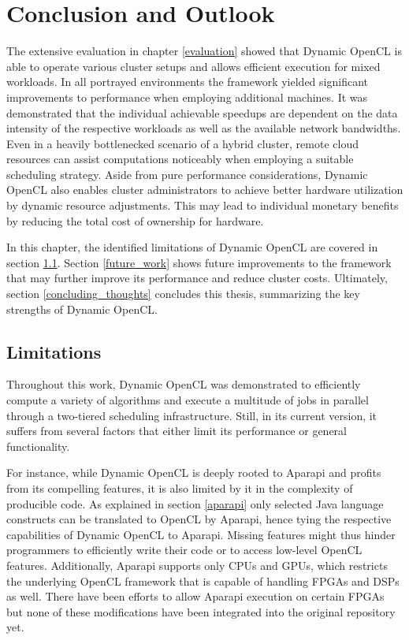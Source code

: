 \chapter{Conclusion and Outlook}
\label{conclusion}
The extensive evaluation in chapter \ref{evaluation} showed that Dynamic OpenCL is able to operate various cluster setups and allows efficient execution for mixed workloads. In all portrayed environments the framework yielded significant improvements to performance when employing additional machines. It was demonstrated that the individual achievable speedups are dependent on the data intensity of the respective workloads as well as the available network bandwidths. Even in a heavily bottlenecked scenario of a hybrid cluster, remote cloud resources can assist computations noticeably when employing a suitable scheduling strategy. Aside from pure performance considerations, Dynamic OpenCL also enables cluster administrators to achieve better hardware utilization by dynamic resource adjustments. This may lead to individual monetary benefits by reducing the total cost of ownership for hardware.

In this chapter, the identified limitations of Dynamic OpenCL are covered in section \ref{limitations}. Section \ref{future_work} shows future improvements to the framework that may further improve its performance and reduce cluster costs. Ultimately, section \ref{concluding_thoughts} concludes this thesis, summarizing the key strengths of Dynamic OpenCL.

\section{Limitations}
\label{limitations}
Throughout this work, Dynamic OpenCL was demonstrated to efficiently compute a variety of algorithms and execute a multitude of jobs in parallel through a two-tiered scheduling infrastructure. Still, in its current version, it suffers from several factors that either limit its performance or general functionality.

For instance, while Dynamic OpenCL is deeply rooted to Aparapi and profits from its compelling features, it is also limited by it in the complexity of producible code. As explained in section \ref{aparapi} only selected Java language constructs can be translated to OpenCL by Aparapi, hence tying the respective capabilities of Dynamic OpenCL to Aparapi. Missing features might thus hinder programmers to efficiently write their code or to access low-level OpenCL features. Additionally, Aparapi supports only CPUs and GPUs, which restricts the underlying OpenCL framework that is capable of handling FPGAs and DSPs as well. There have been efforts to allow Aparapi execution on certain FPGAs but none of these modifications have been integrated into the original repository yet\cite{aparapi_ucores}.

